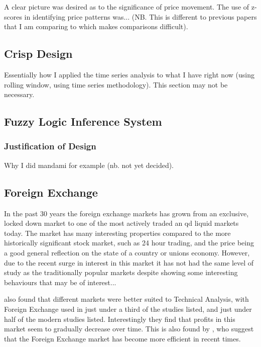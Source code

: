 \documentclass{article}
\theoremstyle{definition}
\begin{document}
A clear picture was desired as to the significance of price movement. The use of z-scores in identifying price patterns was... (NB. This is different to previous papers that I am comparing to which makes comparisons difficult).

\subsection{Crisp Design}

Essentially how I applied the time series analysis to what I have right now (using rolling window, using time series methodology). This section may not be necessary.

\subsection{Fuzzy Logic Inference System}

\subsubsection{Justification of Design}

Why I did mandami for example (nb. not yet decided).

\subsection{Foreign Exchange}

In the past 30 years the foreign exchange markets has grown from an exclusive, locked down market to one of the most actively traded an qd liquid markets today. The market has many interesting properties compared to the more historically significant stock market, such as 24 hour trading, and the price being a good general reflection on the state of a country or unions economy. However, due to the recent surge in interest in this market it has not had the same level of study as the traditionally popular markets despite showing some interesting behaviours that may be of interest...

\cite{taprofitability} also found that different markets were better suited to Technical Analysis, with Foreign Exchange used in just under a third of the studies listed, and just under half of the modern studies listed. Interestingly they find that profits in this market seem to gradually decrease over time. This is also found by \cite{ttrp2006}, who suggest that the Foreign Exchange market has become more efficient in recent times.
\end{document}
